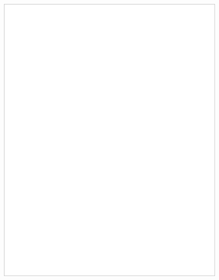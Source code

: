 \begin{figure}[H] 
        \centering\includegraphics[width=\textwidth]{img/diagrams/personas/user2.png}
	\captionsetup{labelformat=empty}
        \caption[]{}
\end{figure}
